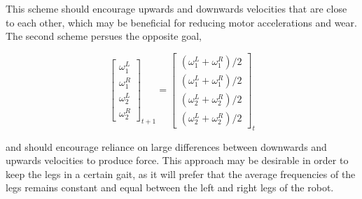 \noindent This scheme should encourage upwards and downwards velocities that are close to each other, which may be beneficial for reducing motor accelerations and wear. The second scheme persues the opposite goal,

\begin{equation}
    \begin{bmatrix} \omega_1^L \\ \omega_1^R \\ \omega_2^L \\ \omega_2^R \end{bmatrix}_{t+1} = \begin{bmatrix} (\omega_1^L + \omega_1^R)/2 \\(\omega_1^L + \omega_1^R)/2 \\ (\omega_2^L + \omega_2^R)/2 \\ (\omega_2^L + \omega_2^R)/2 \end{bmatrix}_{t}
\end{equation}

\noindent and should encourage reliance on large differences between downwards and upwards velocities to produce force. This approach may be desirable in order to keep the legs in a certain gait, as it will prefer that the average frequencies of the legs remains constant and equal between the left and right legs of the robot. 

